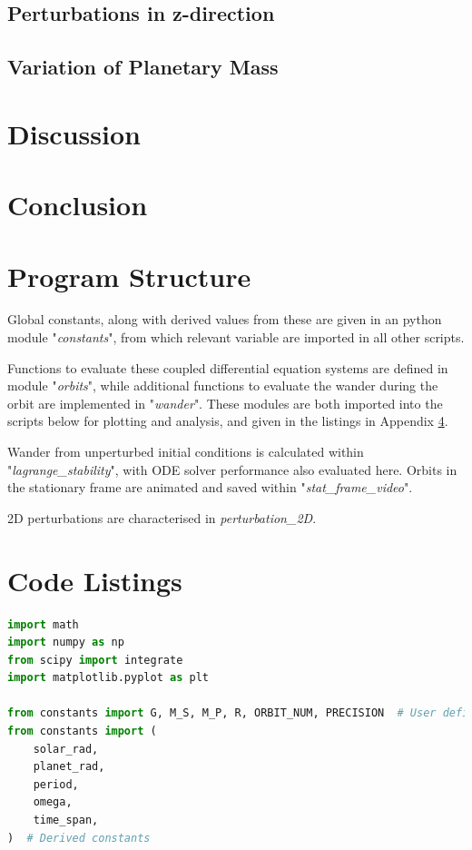 \documentclass[11pt, a4paper,twocolumn]{article} %
\begin{document}
\subsection{Perturbations in z-direction}

\subsection{Variation of Planetary Mass}

\section{Discussion}
\section{Conclusion}




\clearpage
\printbibliography

\onecolumn
\begin{appendices}
\section{Program Structure} \label{structure}
Global constants, along with derived values from these are given in an python module "\textit{constants}", from which relevant variable are imported in all other scripts.

Functions to evaluate these coupled differential equation systems are defined in module "\textit{orbits}", while additional functions to evaluate the wander during the orbit are implemented in "\textit{wander}". These modules are both imported into the scripts below for plotting and analysis, and given in the listings in Appendix \ref{Code}.

Wander from unperturbed initial conditions is calculated within "\textit{lagrange\_stability}", with ODE solver performance also evaluated here.
Orbits in the stationary frame are animated and saved within "\textit{stat\_frame\_video}".

2D perturbations are characterised in \textit{perturbation\_2D}.


\section{Code Listings} \label{Code}
\begin{lstlisting}[language=Python]
import math
import numpy as np
from scipy import integrate
import matplotlib.pyplot as plt

from constants import G, M_S, M_P, R, ORBIT_NUM, PRECISION  # User defined constants
from constants import (
	solar_rad,
	planet_rad,
	period,
	omega,
	time_span,
)  # Derived constants


\end{lstlisting}

\end{appendices}
\end{document}

